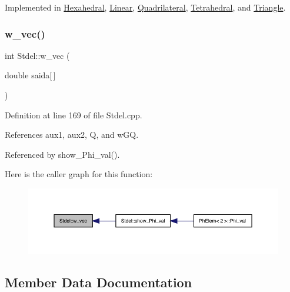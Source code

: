 Implemented in \hyperlink{classHexahedral_acbbaec7da99759f1d6df6587a9825c22}{Hexahedral}, \hyperlink{classLinear_a4ddfe0022d153dc9df417b84b6f7013d}{Linear}, \hyperlink{classQuadrilateral_a0ee1b169fe49cc443684dfe2eb605b17}{Quadrilateral}, \hyperlink{classTetrahedral_af8d3f23744224a67aaaebe66f427678f}{Tetrahedral}, and \hyperlink{classTriangle_acc741aa9440446498e212d00cff284e8}{Triangle}.

\mbox{\label{classStdel_a395c8d7d7890a9efdea23932fa22b420}} 
\subsubsection{\texorpdfstring{w\+\_\+vec()}{w\_vec()}}
{\footnotesize\ttfamily int Stdel\+::w\+\_\+vec (\begin{DoxyParamCaption}\item[{double}]{saida\mbox{[}$\,$\mbox{]} }\end{DoxyParamCaption})}



Definition at line 169 of file Stdel.\+cpp.



References aux1, aux2, Q, and w\+GQ.



Referenced by show\+\_\+\+Phi\+\_\+val().

Here is the caller graph for this function\+:
\nopagebreak
\begin{figure}[H]
\begin{center}
\leavevmode
\includegraphics[width=350pt]{classStdel_a395c8d7d7890a9efdea23932fa22b420_icgraph}
\end{center}
\end{figure}


\subsection{Member Data Documentation}
\mbox{\label{classStdel_a8b082d27e5c3cab7ad2045b464af0fd9}} 
